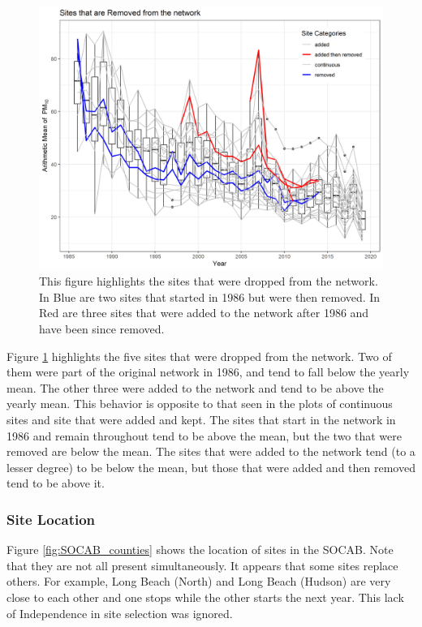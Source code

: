 \documentclass{article}
\begin{document}
\begin{figure}[ht]
    \centering
    \includegraphics[width = \textwidth]{Figures/site_timing_trace-Removed.png}
    \caption{This figure highlights the sites that were dropped from the network.  In Blue are two sites that started in 1986 but were then removed.  In Red are three sites that were added to the network after 1986 and have been since removed.  }
    \label{fig:site_timing_trace-Removed}
\end{figure}
Figure  \ref{fig:site_timing_trace-Removed} highlights the five sites that were dropped from the network.  Two of them were part of the original network in 1986, and tend to fall below the yearly mean.   The other three were added to the network and tend to be above the yearly mean.  This behavior is opposite to that seen in the plots of continuous sites and site that were added and kept.  The sites that start in the network in 1986 and remain throughout tend to be above the mean, but the two that were removed are below the mean.  The sites that were added to the network tend (to a lesser degree) to be below the mean, but those that were added and then removed tend to be above it.

\subsubsection*{Site Location}
\label{subsubsec:sitelocn}
Figure  \ref{fig:SOCAB_counties} shows the location of sites in the \ac{SOCAB}.  Note that they are not all present simultaneously.  
It appears that some sites replace others.  For example, Long Beach (North) and Long Beach (Hudson) are very close to each other and one stops while the other starts the next year.  This lack of Independence in site selection was ignored.
\end{document}
